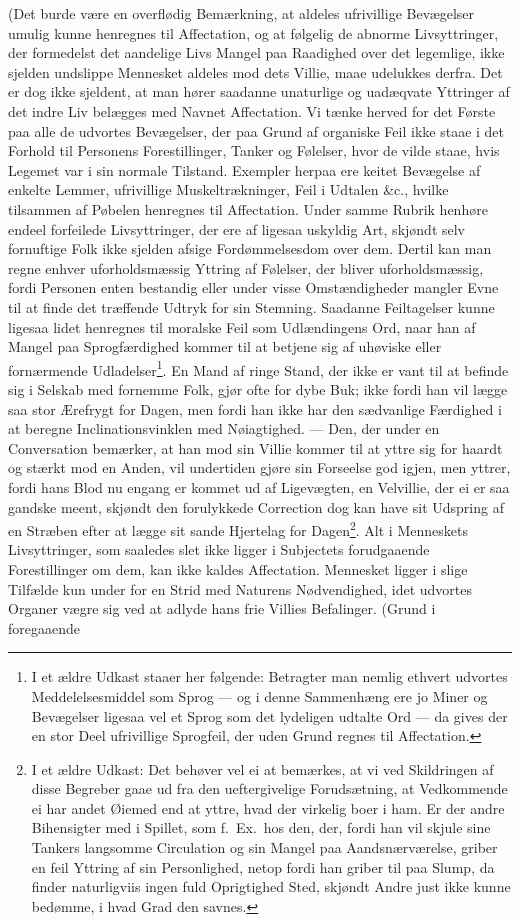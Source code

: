 \documentclass[12pt]{article}
\newcommand{\opage}[1]{\marginnote{\footnotesize\textit{[#1]}}}
\begin{document}
(Det burde være en overflødig Bemærkning, at aldeles ufri\opage{167}villige Bevægelser umulig kunne henregnes til Affectation, og at følgelig de abnorme Livsyttringer, der formedelst det aandelige Livs Mangel paa Raadighed over det legemlige, ikke sjelden undslippe Mennesket aldeles mod dets Villie, maae udelukkes derfra. Det er dog ikke sjeldent, at man hører saadanne unaturlige og uadæqvate Yttringer af det indre Liv belægges med Navnet Affectation. Vi tænke herved for det Første paa alle de udvortes Bevægelser, der paa Grund af organiske Feil ikke staae i det Forhold til Personens Forestillinger, Tanker og Følelser, hvor de vilde staae, hvis Legemet var i sin normale Tilstand. Exempler herpaa ere keitet Bevægelse af enkelte Lemmer, ufrivillige Muskeltrækninger, Feil i Udtalen \&c., hvilke tilsammen af Pøbelen henregnes til Affectation. Under samme Rubrik henhøre endeel forfeilede Livsyttringer, der ere af ligesaa uskyldig Art, skjøndt selv fornuftige Folk ikke sjelden afsige Fordømmelsesdom over dem. Dertil kan man regne enhver uforholdsmæssig Yttring af Følelser, der bliver uforholdsmæssig, fordi Personen enten bestandig eller under visse Omstændigheder mangler Evne til at finde det træffende Udtryk for sin Stemning. Saadanne Feiltagelser kunne ligesaa lidet henregnes til moralske Feil som Udlændingens Ord, naar han af Mangel paa Sprogfærdighed kommer til at betjene sig af uhøviske eller fornærmende Udladelser\footnote{I et ældre Udkast staaer her følgende: Betragter man nemlig ethvert udvortes Meddelelsesmiddel som Sprog --- og i denne Sammenhæng ere jo Miner og Bevægelser ligesaa vel et Sprog som det lydeligen udtalte Ord --- da gives der en stor Deel ufrivillige Sprogfeil, der uden Grund regnes til Affectation.}. En Mand af ringe Stand, der ikke er vant til at befinde sig i Selskab med fornemme Folk, gjør ofte for dybe Buk; ikke fordi han vil lægge saa stor Ærefrygt for Dagen, men fordi han ikke har den sædvanlige Færdighed i at beregne Inclinationsvinklen \opage{168}med Nøiagtighed. --- Den, der under en Conversation bemærker, at han mod sin Villie kommer til at yttre sig for haardt og stærkt mod en Anden, vil undertiden gjøre sin Forseelse god igjen, men yttrer, fordi hans Blod nu engang er kommet ud af Ligevægten, en Velvillie, der ei er saa gandske meent, skjøndt den forulykkede Correction dog kan have sit Udspring af en Stræben efter at lægge sit sande Hjertelag for Dagen\footnote{I et ældre Udkast: Det behøver vel ei at bemærkes, at vi ved Skildringen af disse Begreber gaae ud fra den ueftergivelige Forudsætning, at Vedkommende ei har andet Øiemed end at yttre, hvad der virkelig boer i ham. Er der andre Bihensigter med i Spillet, som f.\ Ex.\ hos den, der, fordi han vil skjule sine Tankers langsomme Circulation og sin Mangel paa Aandsnærværelse, griber en feil Yttring af sin Personlighed, netop fordi han griber til paa Slump, da finder naturligviis ingen fuld Oprigtighed Sted, skjøndt Andre just ikke kunne bedømme, i hvad Grad den savnes.}. Alt i Menneskets Livsyttringer, som saaledes slet ikke ligger i Subjectets forudgaaende Forestillinger om dem, kan ikke kaldes Affectation. Mennesket ligger i slige Tilfælde kun under for en Strid med Naturens Nødvendighed, idet udvortes Organer vægre sig ved at adlyde hans frie Villies Befalinger. (Grund i foregaaende 
\end{document}
